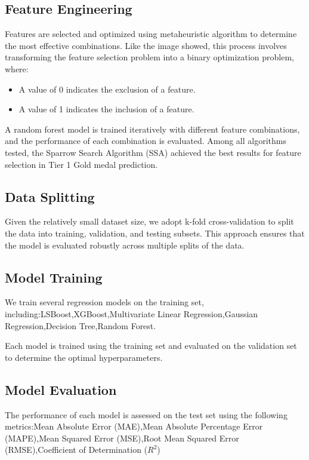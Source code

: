 \documentclass{mcmthesis}
\begin{document}
\subsection{Feature Engineering}

Features are selected and optimized using metaheuristic algorithm to determine the most effective combinations. Like the image showed, this process involves transforming the feature selection problem into a binary optimization problem, where:
\begin{itemize}
    \item A value of 0 indicates the exclusion of a feature.
    \item A value of 1 indicates the inclusion of a feature.
\end{itemize}
A random forest model is trained iteratively with different feature combinations, and the performance of each combination is evaluated. Among all algorithms tested, the Sparrow Search Algorithm (SSA) achieved the best results for feature selection in Tier 1 Gold medal prediction.


\subsection{Data Splitting}

Given the relatively small dataset size, we adopt k-fold cross-validation to split the data into training, validation, and testing subsets. This approach ensures that the model is evaluated robustly across multiple splits of the data.

\subsection{Model Training}

We train several regression models on the training set, including:LSBoost,XGBoost,Multivariate Linear Regression,Gaussian Regression,Decision Tree,Random Forest.

Each model is trained using the training set and evaluated on the validation set to determine the optimal hyperparameters.

\subsection{Model Evaluation}

The performance of each model is assessed on the test set using the following metrics:Mean Absolute Error (MAE),Mean Absolute Percentage Error (MAPE),Mean Squared Error (MSE),Root Mean Squared Error (RMSE),Coefficient of Determination ($R^2$)
\end{document}
